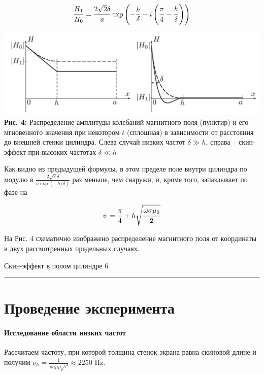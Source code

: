 \documentclass[12pt,a4paper]{scrartcl}
\begin{document}
	$$\dfrac{\strut H_1}{\strut H_0} = \dfrac{\strut 2\sqrt{2}\delta}{\strut a} \exp\left(-\frac{h}{\delta} - i\left(\dfrac{\strut \pi}{\strut 4} - \dfrac{\strut h}{\strut \delta}\right)\right)$$
	
	\begin{center}
		\includegraphics[scale=0.25]{PIC_4.png}
		\\\textbf{Рис. 4:} Распределение амплитуды колебаний магнитного поля (пунктир) и его мгновенного значения при некотором $t$ (сплошная) в зависимости от расстояния до внешней стенки цилиндра. Слева случай низких частот $\delta \gg h$, справа	-- скин-эффект при высоких частотах $\delta \ll h$
	\end{center}

	Как видно из предыдущей формулы, в этом пределе поле внутри цилиндра по модулю в $\frac{2\sqrt{2}\delta}{a\exp(-h/\delta)}$ раз меньше, чем снаружи, и, кроме того, запаздывает
	по фазе на
	
	$$\psi = \dfrac{\strut \pi}{\strut 4} + h\sqrt{\dfrac{\strut \omega \sigma \mu_0}{\strut 2}}$$
	
	На Рис. 4 схематично изображено распределение магнитного поля от координаты в двух рассмотренных предельных случаях.
	
	
	\newpage
	
	\begin{flushleft}
		\footnotesize{Скин-эффект в полом цилиндре} \hspace{\fill} \footnotesize{6}
		\\[-0.3cm]\noindent\rule{\textwidth}{0.3pt}
	\end{flushleft}
	
	\section{Проведение эксперимента}
	
	\paragraph{Исследование области низких частот} \hfill
	
	Рассчитаем частоту, при которой толщина стенок экрана равна скиновой длине и получим $\nu_h = \frac{1}{\pi \sigma \mu \mu_0 h^2} \approx 2250$ Hz.
	
\end{document}
